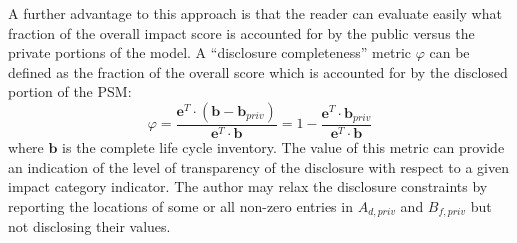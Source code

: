 A further advantage to this approach is that the reader can evaluate easily what fraction of the overall impact score is accounted for by the public versus the private portions of the model.  A ``disclosure completeness'' metric $\varphi$ can be defined as the fraction of the overall score which is accounted for by the disclosed portion of the PSM:
\begin{equation}
  \varphi =  \frac{\mathbf{e}^T\cdot(\mathbf{b} - \mathbf{b}_{priv})}{\mathbf{e}^T\cdot\mathbf{b}} = 1 - \frac{\mathbf{e}^T\cdot\mathbf{b}_{priv}}{\mathbf{e}^T\cdot\mathbf{b}}
  \label{eqn:metric}
\end{equation}
where $\mathbf{b}$ is the complete life cycle inventory.  The value of this metric can provide an indication of the level of transparency of the disclosure with respect to a given impact category indicator.  The author may relax the disclosure constraints by reporting the locations of some or all non-zero entries in $A_{d,priv}$ and $B_{f,priv}$ but not disclosing their values.








